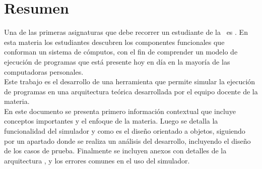 \chapter*{Resumen}

\parbox{8cm}{
Una de las primeras asignaturas que debe recorrer un estudiante de la \tpi\ es \textbf{\orga}. En esta materia los estudiantes descubren los componentes funcionales que conforman un sistema de cómputos, con el fin de comprender un modelo de ejecución de programas que está presente hoy en día en la mayoría de las computadoras personales.\\

Este trabajo es el desarrollo de una herramienta que permite simular la ejecución de programas en una arquitectura teórica desarrollada por el equipo docente de la materia.\\

En este documento se presenta primero información contextual que incluye conceptos importantes y el enfoque de la materia. Luego se detalla la funcionalidad del simulador y como es el diseño orientado a objetos, siguiendo por un apartado donde se realiza un análisis del desarrollo, incluyendo el diseño de los casos de prueba. Finalmente se incluyen anexos con detalles de la arquitectura \Q, y los errores comunes en el uso del simulador.
}
